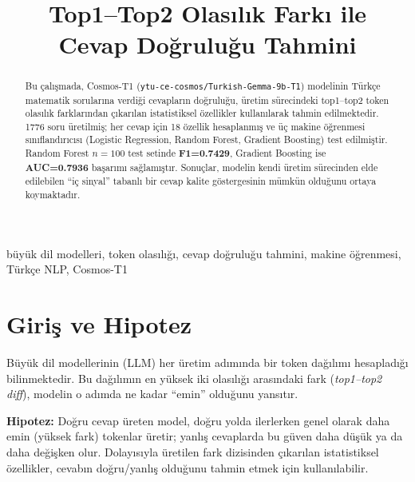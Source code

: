 \documentclass[conference]{IEEEtran}
\begin{document}
\title{Top1--Top2 Olasılık Farkı ile\\Cevap Doğruluğu Tahmini}

\author{
}

\maketitle

\begin{abstract}
Bu çalışmada, Cosmos-T1 (\texttt{ytu-ce-cosmos/Turkish-Gemma-9b-T1}) modelinin
Türkçe matematik sorularına verdiği cevapların doğruluğu, üretim sürecindeki
top1--top2 token olasılık farklarından çıkarılan istatistiksel özellikler
kullanılarak tahmin edilmektedir. 1776 soru üretilmiş; her cevap için 18 özellik
hesaplanmış ve üç makine öğrenmesi sınıflandırıcısı (Logistic Regression, Random
Forest, Gradient Boosting) test edilmiştir. Random Forest $n=100$ test setinde
\textbf{F1=0.7429}, Gradient Boosting ise \textbf{AUC=0.7936} başarımı
sağlamıştır. Sonuçlar, modelin kendi üretim sürecinden elde edilebilen ``iç sinyal''
tabanlı bir cevap kalite göstergesinin mümkün olduğunu ortaya koymaktadır.
\end{abstract}

\begin{IEEEkeywords}
büyük dil modelleri, token olasılığı, cevap doğruluğu tahmini, makine öğrenmesi,
Türkçe NLP, Cosmos-T1
\end{IEEEkeywords}

\section{Giriş ve Hipotez}

Büyük dil modellerinin (LLM) her üretim adımında bir token dağılımı hesapladığı
bilinmektedir. Bu dağılımın en yüksek iki olasılığı arasındaki fark
(\emph{top1--top2 diff}), modelin o adımda ne kadar ``emin'' olduğunu yansıtır.

\textbf{Hipotez:} Doğru cevap üreten model, doğru yolda ilerlerken genel olarak
daha emin (yüksek fark) tokenlar üretir; yanlış cevaplarda bu güven daha düşük ya
da daha değişken olur. Dolayısıyla üretilen fark dizisinden çıkarılan istatistiksel
özellikler, cevabın doğru/yanlış olduğunu tahmin etmek için kullanılabilir.
\end{document}
